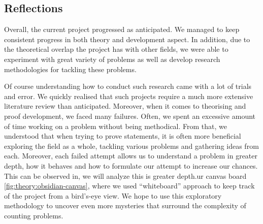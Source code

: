 \subsection{Reflections}

Overall, the current project progressed as anticipated. We managed to keep
consistent progress in both theory and development aspect. In addition,
due to the theoretical overlap the project has with other fields, we
were able to experiment with great variety of problems as well as
develop research methodologies for tackling these problems.

Of course understanding how to conduct such research came with a lot of trials and error.
We quickly realised that such projects require a much more extensive literature review than anticipated.
Moreover, when it comes to theorising and proof development, we faced many failures.
Often, we spent an excessive amount of time working on a problem without being methodical.
From that, we understood that when trying to prove statements, it is often more beneficial
exploring the field as a whole, tackling various problems and gathering ideas from each.
Moreover, each failed attempt allows us to understand a problem in greater depth, how it behaves
and how to formulate our attempt to increase our chances.
This can be observed in, we will analyze this is greater depth.ur canvas board \ref{fig:theory:obsidian-canvas}, where we
used ``whiteboard'' approach to keep track of the project from a bird's-eye view. 
We hope to use this exploratory methodology to uncover even more mysteries that surround
the complexity of counting problems.



